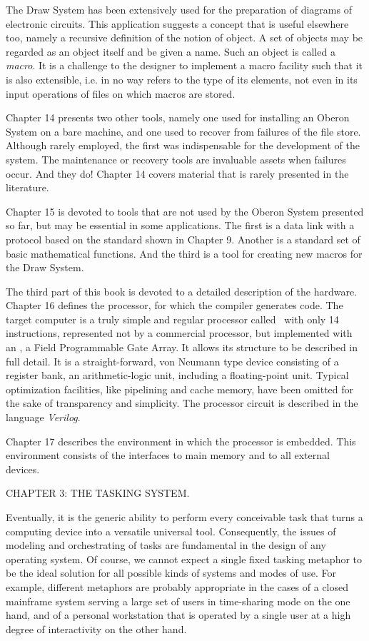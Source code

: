 The Draw System has been extensively used for the preparation of
diagrams of electronic circuits. This application suggests a concept
that is useful elsewhere too, namely a recursive definition of the
notion of object. A set of objects may be regarded as an object itself
and be given a name. Such an object is called a \emph{macro}. It is a
challenge to the designer to implement a macro facility such that it
is also extensible, i.e. in no way refers to the type of its elements,
not even in its input operations of files on which macros are stored.

Chapter 14 presents two other tools, namely one used for installing an
Oberon System on a bare machine, and one used to recover from failures
of the file store. Although rarely employed, the first was
indispensable for the development of the system. The maintenance or
recovery tools are invaluable assets when failures occur. And they do!
Chapter 14 covers material that is rarely presented in the literature.

Chapter 15 is devoted to tools that are not used by the Oberon System
presented so far, but may be essential in some applications. The first
is a data link with a protocol based on the  standard shown in
Chapter 9. Another is a standard set of basic mathematical
functions. And the third is a tool for creating new macros for the
Draw System.

The third part of this book is devoted to a detailed description of
the hardware. Chapter 16 defines the processor, for which the compiler
generates code. The target computer is a truly simple and regular
processor called \RISC\ with only 14 instructions, represented not by a
commercial processor, but implemented with an , a Field
Programmable Gate Array. It allows its structure to be described in
full detail. It is a straight-forward, von Neumann type device
consisting of a register bank, an arithmetic-logic unit, including a
floating-point unit. Typical optimization facilities, like pipelining
and cache memory, have been omitted for the sake of transparency and
simplicity. The processor circuit is described in the language
\emph{Verilog}.

Chapter 17 describes the environment in which the processor is
embedded. This environment consists of the interfaces to main memory
and to all external devices.

\beginchapter CHAPTER 3: THE TASKING SYSTEM.

Eventually, it is the generic ability to perform every conceivable
task that turns a computing device into a versatile universal
tool. Consequently, the issues of modeling and orchestrating of tasks
are fundamental in the design of any operating system. Of course, we
cannot expect a single fixed tasking metaphor to be the ideal solution
for all possible kinds of systems and modes of use. For example,
different metaphors are probably appropriate in the cases of a closed
mainframe system serving a large set of users in time-sharing mode on
the one hand, and of a personal workstation that is operated by a
single user at a high degree of interactivity on the other hand.

